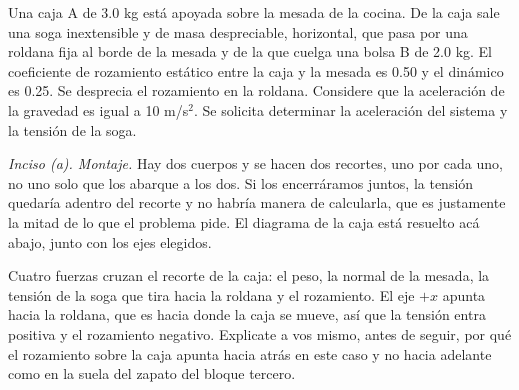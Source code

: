 \documentclass[11pt,openany]{book}
\begin{document}
\begin{ejemplo}[completo]
Una caja A de 3.0 kg está apoyada sobre la mesada de la cocina. De la caja sale una soga inextensible y de masa despreciable, horizontal, que pasa por una roldana fija al borde de la mesada y de la que cuelga una bolsa B de 2.0 kg. El coeficiente de rozamiento estático entre la caja y la mesada es 0.50 y el dinámico es 0.25. Se desprecia el rozamiento en la roldana. Considere que la aceleración de la gravedad es igual a 10 m/s$^2$. Se solicita determinar la aceleración del sistema y la tensión de la soga.

\medskip
\textit{Inciso (a). Montaje.} Hay dos cuerpos y se hacen dos recortes, uno por cada uno, no uno solo que los abarque a los dos. Si los encerráramos juntos, la tensión quedaría adentro del recorte y no habría manera de calcularla, que es justamente la mitad de lo que el problema pide. El diagrama de la caja está resuelto acá abajo, junto con los ejes elegidos.

\begin{center}
\end{center}

Cuatro fuerzas cruzan el recorte de la caja: el peso, la normal de la mesada, la tensión de la soga que tira hacia la roldana y el rozamiento. El eje $+x$ apunta hacia la roldana, que es hacia donde la caja se mueve, así que la tensión entra positiva y el rozamiento negativo. Explicate a vos mismo, antes de seguir, por qué el rozamiento sobre la caja apunta hacia atrás en este caso y no hacia adelante como en la suela del zapato del bloque tercero.


\end{ejemplo}
\end{document}
